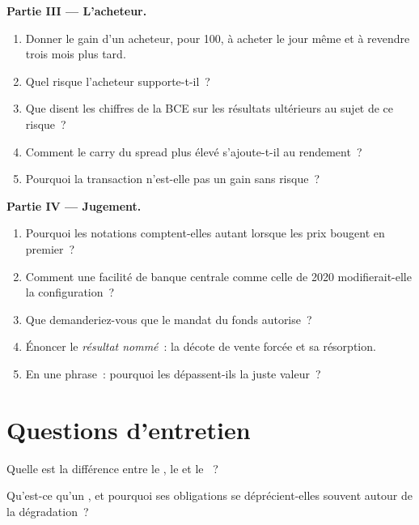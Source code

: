 \begin{problem}
\medskip\noindent\textbf{Partie III --- L'acheteur.}
\begin{enumerate}[resume]
\item Donner le gain d'un acheteur, pour 100, à acheter le jour même et à revendre trois mois plus tard.
\item Quel risque l'acheteur supporte-t-il~?
\item Que disent les chiffres de la BCE sur les résultats ultérieurs au sujet de ce risque~?
\item Comment le carry du spread plus élevé s'ajoute-t-il au rendement~?
\item Pourquoi la transaction n'est-elle pas un gain sans risque~?
\end{enumerate}

\medskip\noindent\textbf{Partie IV --- Jugement.}
\begin{enumerate}[resume]
\item Pourquoi les notations comptent-elles autant lorsque les prix bougent en premier~?
\item Comment une facilité de banque centrale comme celle de 2020 modifierait-elle la configuration~?
\item Que demanderiez-vous que le mandat du fonds autorise~?
\item Énoncer le \emph{résultat nommé}~: la décote de vente forcée et sa résorption.
\item En une phrase~: pourquoi les  dépassent-ils la juste valeur~?
\end{enumerate}
\end{problem}

\section{Questions d'entretien}

\begin{interviewq}\label{iq:m2:corporate-bonds:1}
Quelle est la différence entre le , le  et le ~?
\end{interviewq}

\begin{interviewq}\label{iq:m2:corporate-bonds:2}
Qu'est-ce qu'un , et pourquoi ses obligations se déprécient-elles souvent autour de la dégradation~?
\end{interviewq}

